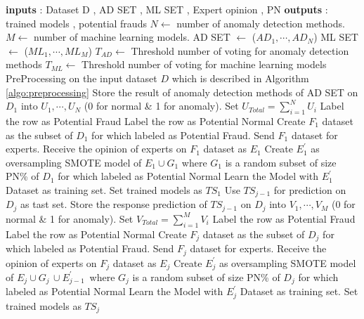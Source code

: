 \documentclass[12pt]{article}
\begin{document}
\begin{algorithm}[H]
    \tiny
    \caption{Simple structure of the SAD algorithm}\label{algo:simple}
    \begin{algorithmic}
        \STATE \textbf{inputs} : Dataset D , AD SET , ML SET , Expert opinion , PN
        \STATE \textbf{outputs}  : trained models , potential frauds
        \STATE $N \gets$ number of anomaly detection methods.
        \STATE $M \gets$ number of machine learning models.
        \STATE AD SET $\gets$ ($AD_1 , \cdots , AD_{N} $)
        \STATE ML SET  $\gets$ ($ML_1 , \cdots , ML_{M} $)
        \STATE $T_{AD} \gets$ Threshold number of voting for anomaly detection methods
        \STATE $T_{ML} \gets$ Threshold number of voting for machine learning models
        \STATE PreProcessing on the input dataset $D$ which is described in Algorithm \ref{algo:preprocessing}
        \STATE Store the result of anomaly detection methods of AD SET on $D_1$  into $U_{1} , \cdots , U_{N}$ (0 for normal \& 1 for anomaly).
        \STATE Set $U_{Total} = \sum_{i = 1}^{N}{U_{i}}$
        \STATE Label the row as Potential Fraud
        \ELSE
        \STATE Label the row as Potential Normal
        \ENDIF
        \ENDFOR
        \STATE Create $F_1$ dataset as the subset of $D_1$  for which labeled as Potential Fraud.
        \STATE Send $F_1$ dataset for experts.
        \STATE Receive the opinion of experts on $F_1$ dataset as $E_1$
        \STATE Create $E^\prime_1$ as oversampling SMOTE model of $E_1 \cup G_1$  where $G_1$ is a random subset of size PN\% of $D_1$ for which labeled as Potential Normal
        \STATE Learn the Model with $E^\prime_1$ Dataset as training set.
        \ENDFOR
        \STATE Set trained models as $TS_1$
        \STATE Use $TS_{j-1}$ for prediction on $D_j$ as tast set.
        \STATE Store the response prediction of  $TS_{j-1}$ on $D_j$  into $V_{1} , \cdots , V_{M}$ (0 for normal \& 1 for anomaly).
        \STATE Set $V_{Total} = \sum_{i = 1}^{M}{V_{i}}$
        \STATE Label the row as Potential Fraud
        \ELSE
        \STATE Label the row as Potential Normal
        \ENDIF
        \STATE Create $F_j$ dataset as the subset of $D_j$  for which labeled as Potential Fraud.
        \STATE Send $F_j$ dataset for experts.
        \STATE Receive the opinion of experts on $F_j$ dataset as $E_j$
        \STATE Create $E^\prime_j$ as oversampling SMOTE model of $E_j \cup G_j\, \cup E^\prime_{j-1} \, $  where $G_j$ is a random subset of size PN\% of $D_j$ for which labeled as Potential Normal
        \STATE Learn the Model with $E^\prime_j$ Dataset as training set.
        \ENDFOR
        \STATE Set trained models as $TS_j$
        \ENDFOR
        \ENDFOR
    \end{algorithmic}
\end{algorithm}
\end{document}
